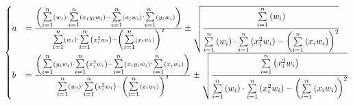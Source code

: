 \documentclass[english,brazil]{article}
\begin{document}
			\[
				\begin{cases}
					a & =\frac{\left({\displaystyle {\scriptscriptstyle {\textstyle \overset{n}{\underset{i=1}{\sum}}}}}\left(w_{i}\right)\cdot{\displaystyle {\scriptscriptstyle {\textstyle \overset{n}{\underset{i=1}{\sum}}}}}\left(x_{i}y_{i}w_{i}\right)-{\displaystyle {\scriptscriptstyle {\textstyle \overset{n}{\underset{i=1}{\sum}}}}}\left(x_{i}w_{i}\right){\scriptscriptstyle {\textstyle \overset{n}{\cdot\underset{i=1}{\sum}}}}\left(y_{i}w_{i}\right)\right)}{{\displaystyle {\scriptscriptstyle {\textstyle \overset{n}{\underset{i=1}{\sum}}}}}\left(w_{i}\right)\cdot{\displaystyle {\scriptscriptstyle {\textstyle \overset{n}{\underset{i=1}{\sum}}}}}\left(x_{i}^{2}w_{i}\right)-\left({\displaystyle {\scriptscriptstyle {\textstyle \overset{n}{\underset{i=1}{\sum}}}}}\left(x_{i}w_{i}\right)\right)^{2}}\pm\sqrt{\cfrac{{\displaystyle {\scriptscriptstyle {\textstyle \overset{n}{\underset{i=1}{\sum}}}}}\left(w_{i}\right)}{{\displaystyle {\scriptscriptstyle {\textstyle \overset{n}{\underset{i=1}{\sum}}}}}\left(w_{i}\right)\cdot{\displaystyle {\scriptscriptstyle {\textstyle \overset{n}{\underset{i=1}{\sum}}}}}\left(x_{i}^{2}w_{i}\right)-\left({\displaystyle {\scriptscriptstyle {\textstyle \overset{n}{\underset{i=1}{\sum}}}}}\left(x_{i}w_{i}\right)\right)^{2}}}\\
					b & =\frac{\left({\displaystyle {\scriptscriptstyle {\textstyle \overset{n}{\underset{i=1}{\sum}}}}}\left(y_{i}w_{i}\right)\cdot{\displaystyle {\scriptscriptstyle {\textstyle \overset{n}{\underset{i=1}{\sum}}}}}\left(x_{i}^{2}w_{i}\right)-{\displaystyle {\scriptscriptstyle {\textstyle \overset{n}{\underset{i=1}{\sum}}}}}\left(x_{i}y_{i}w_{i}\right){\scriptscriptstyle {\textstyle \overset{n}{\cdot\underset{i=1}{\sum}}}}\left(x_{i}w_{i}\right)\right)}{{\displaystyle {\scriptscriptstyle {\textstyle \overset{n}{\underset{i=1}{\sum}}}}}\left(w_{i}\right)\cdot{\displaystyle {\scriptscriptstyle {\textstyle \overset{n}{\underset{i=1}{\sum}}}}}\left(x_{i}^{2}w_{i}\right)-\left({\displaystyle {\scriptscriptstyle {\textstyle \overset{n}{\underset{i=1}{\sum}}}}}\left(x_{i}w_{i}\right)\right)^{2}}\pm\sqrt{\cfrac{{\displaystyle {\scriptscriptstyle {\textstyle \overset{n}{\underset{i=1}{\sum}}}}}\left(x_{i}^{2}w_{i}\right)}{{\displaystyle {\scriptscriptstyle {\textstyle \overset{n}{\underset{i=1}{\sum}}}}}\left(w_{i}\right)\cdot{\displaystyle {\scriptscriptstyle {\textstyle \overset{n}{\underset{i=1}{\sum}}}}}\left(x_{i}^{2}w_{i}\right)-\left({\displaystyle {\scriptscriptstyle {\textstyle \overset{n}{\underset{i=1}{\sum}}}}}\left(x_{i}w_{i}\right)\right)^{2}}}
				\end{cases}
			\]
\end{document}

